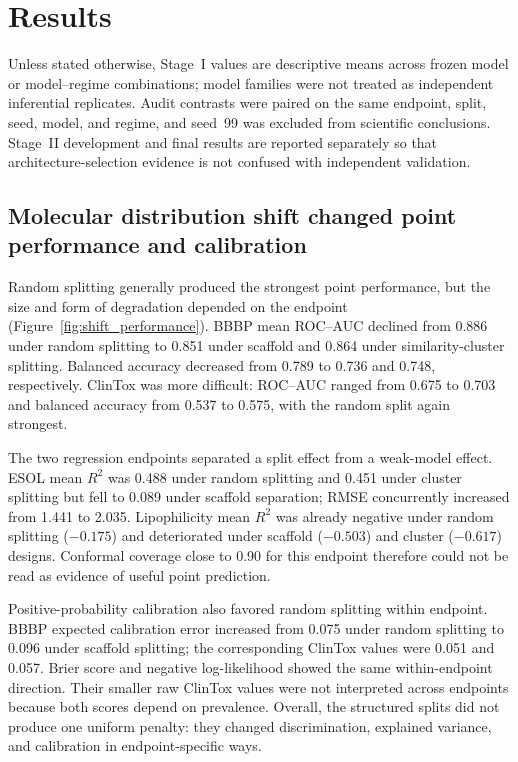 \section{Results}
\label{sec:results}

Unless stated otherwise, Stage~I values are descriptive means across frozen model or model--regime combinations; model families were not treated as independent inferential replicates. Audit contrasts were paired on the same endpoint, split, seed, model, and regime, and seed~99 was excluded from scientific conclusions. Stage~II development and final results are reported separately so that architecture-selection evidence is not confused with independent validation.

\subsection{Molecular distribution shift changed point performance and calibration}
\label{sec:results_performance}

Random splitting generally produced the strongest point performance, but the size and form of degradation depended on the endpoint (Figure~\ref{fig:shift_performance}). BBBP mean ROC--AUC declined from 0.886 under random splitting to 0.851 under scaffold and 0.864 under similarity-cluster splitting. Balanced accuracy decreased from 0.789 to 0.736 and 0.748, respectively. ClinTox was more difficult: ROC--AUC ranged from 0.675 to 0.703 and balanced accuracy from 0.537 to 0.575, with the random split again strongest.

The two regression endpoints separated a split effect from a weak-model effect. ESOL mean $R^2$ was 0.488 under random splitting and 0.451 under cluster splitting but fell to 0.089 under scaffold separation; RMSE concurrently increased from 1.441 to 2.035. Lipophilicity mean $R^2$ was already negative under random splitting ($-0.175$) and deteriorated under scaffold ($-0.503$) and cluster ($-0.617$) designs. Conformal coverage close to 0.90 for this endpoint therefore could not be read as evidence of useful point prediction.

Positive-probability calibration also favored random splitting within endpoint. BBBP expected calibration error increased from 0.075 under random splitting to 0.096 under scaffold splitting; the corresponding ClinTox values were 0.051 and 0.057. Brier score and negative log-likelihood showed the same within-endpoint direction. Their smaller raw ClinTox values were not interpreted across endpoints because both scores depend on prevalence. Overall, the structured splits did not produce one uniform penalty: they changed discrimination, explained variance, and calibration in endpoint-specific ways.

